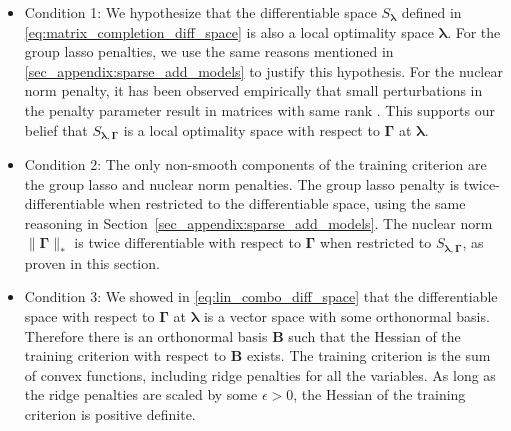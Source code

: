 \documentclass[12pt,letterpaper]{article}
\begin{document}
\begin{itemize}
	\item[] Condition 1: We hypothesize that the differentiable space $S_{\boldsymbol{\lambda}}$ defined in \eqref{eq:matrix_completion_diff_space} is also a local optimality space $\boldsymbol{\lambda}$. For the group lasso penalties, we use the same reasons mentioned in \ref{sec_appendix:sparse_add_models} to justify this hypothesis. For the nuclear norm penalty, it has been observed empirically that small perturbations in the penalty parameter result in matrices with same rank \citep{mazumder2010spectral}. This supports our belief that $S_{\boldsymbol{\lambda}, \boldsymbol{\Gamma}}$ is a local optimality space with respect to $\boldsymbol{\Gamma}$ at $\boldsymbol{\lambda}$.
	\item[] Condition 2: The only non-smooth components of the training criterion are the group lasso and nuclear norm penalties. The group lasso penalty is twice-differentiable when restricted to the differentiable space, using the same reasoning in Section~\ref{sec_appendix:sparse_add_models}. The nuclear norm $\|\boldsymbol{\Gamma}\|_{*}$ is twice differentiable with respect to $\boldsymbol{\Gamma}$ when restricted to $S_{\boldsymbol{\lambda}, \boldsymbol{\Gamma}}$, as proven in this section.
	\hfill {}
	\item[] Condition 3: We showed in \eqref{eq:lin_combo_diff_space} that the differentiable space with respect to $\boldsymbol{\Gamma}$ at $\boldsymbol{\lambda}$ is a vector space with some orthonormal basis. Therefore there is an orthonormal basis $\boldsymbol{B}$ such that the Hessian of the training criterion with respect to $\boldsymbol{B}$ exists. The training criterion is the sum of convex functions, including ridge penalties for all the variables. As long as the ridge penalties are scaled by some $\epsilon > 0$, the Hessian of the training criterion is positive definite.
	\hfill {}
\end{itemize}
\end{document}
